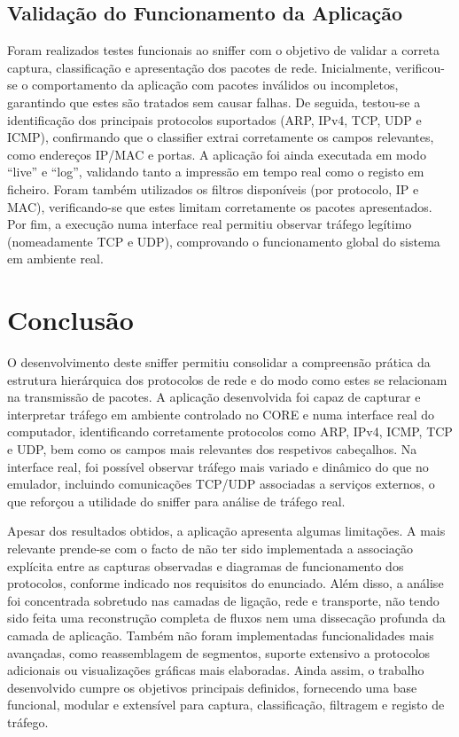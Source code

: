 \documentclass[a4paper]{article}
\begin{document}
\subsection{Validação do Funcionamento da Aplicação}
Foram realizados testes funcionais ao sniffer com o objetivo de validar a correta captura, classificação e apresentação dos pacotes de rede. Inicialmente, verificou-se o comportamento da aplicação com pacotes inválidos ou incompletos, garantindo que estes são tratados sem causar falhas. De seguida, testou-se a identificação dos principais protocolos suportados (ARP, IPv4, TCP, UDP e ICMP), confirmando que o classifier extrai corretamente os campos relevantes, como endereços IP/MAC e portas. A aplicação foi ainda executada em modo “live” e “log”, validando tanto a impressão em tempo real como o registo em ficheiro. Foram também utilizados os filtros disponíveis (por protocolo, IP e MAC), verificando-se que estes limitam corretamente os pacotes apresentados. Por fim, a execução numa interface real permitiu observar tráfego legítimo (nomeadamente TCP e UDP), comprovando o funcionamento global do sistema em ambiente real.

\section{Conclusão}
O desenvolvimento deste sniffer permitiu consolidar a compreensão prática da estrutura hierárquica dos protocolos de rede e do modo como estes se relacionam na transmissão de pacotes. A aplicação desenvolvida foi capaz de capturar e interpretar tráfego em ambiente controlado no CORE e numa interface real do computador, identificando corretamente protocolos como ARP, IPv4, ICMP, TCP e UDP, bem como os campos mais relevantes dos respetivos cabeçalhos. Na interface real, foi possível observar tráfego mais variado e dinâmico do que no emulador, incluindo comunicações TCP/UDP associadas a serviços externos, o que reforçou a utilidade do sniffer para análise de tráfego real. 

Apesar dos resultados obtidos, a aplicação apresenta algumas limitações. A mais relevante prende-se com o facto de não ter sido implementada a associação explícita entre as capturas observadas e diagramas de funcionamento dos protocolos, conforme indicado nos requisitos do enunciado. Além disso, a análise foi concentrada sobretudo nas camadas de ligação, rede e transporte, não tendo sido feita uma reconstrução completa de fluxos nem uma dissecação profunda da camada de aplicação. Também não foram implementadas funcionalidades mais avançadas, como reassemblagem de segmentos, suporte extensivo a protocolos adicionais ou visualizações gráficas mais elaboradas. Ainda assim, o trabalho desenvolvido cumpre os objetivos principais definidos, fornecendo uma base funcional, modular e extensível para captura, classificação, filtragem e registo de tráfego.
\end{document}
